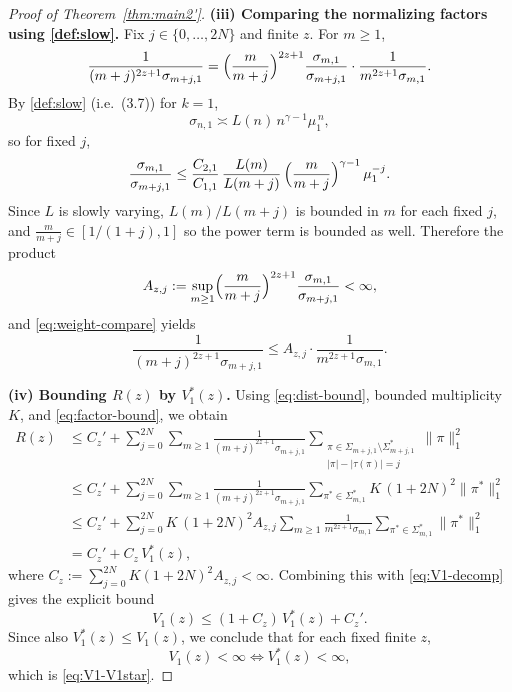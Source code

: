 \documentclass[10pt,a4paper]{amsart}
\begin{document}
\begin{proof}[Proof of Theorem~\ref{thm:main2'}]
\smallskip\noindent
\textbf{(iii) Comparing the normalizing factors using \eqref{def:slow}.}
Fix $j\in\{0,\dots,2N\}$ and finite $z$. For $m\ge1$,
\begin{equation}\label{eq:weight-compare}
\frac{1}{(m+j)^{2z+1}\sigma_{m+j,1}}
=
\Bigl(\frac{m}{m+j}\Bigr)^{2z+1}\frac{\sigma_{m,1}}{\sigma_{m+j,1}}
\cdot \frac{1}{m^{2z+1}\sigma_{m,1}}.
\end{equation}
By \eqref{def:slow} (i.e.\ (3.7)) for $k=1$,
\[
\sigma_{n,1}\asymp L(n)\,n^{\gamma-1}\mu_1^{\,n},
\]
so for fixed $j$,
\[
\frac{\sigma_{m,1}}{\sigma_{m+j,1}}
\le
\frac{C_{2,1}}{C_{1,1}}\,
\frac{L(m)}{L(m+j)}\,
\Bigl(\frac{m}{m+j}\Bigr)^{\gamma-1}\,
\mu_1^{-j}.
\]
Since $L$ is slowly varying, $L(m)/L(m+j)$ is bounded in $m$ for each fixed $j$,
and $\frac{m}{m+j}\in[1/(1+j),1]$ so the power term is bounded as well. Therefore the product
\[
A_{z,j}:=\sup_{m\ge1}\Bigl(\frac{m}{m+j}\Bigr)^{2z+1}\frac{\sigma_{m,1}}{\sigma_{m+j,1}}<\infty,
\]
and \eqref{eq:weight-compare} yields
\begin{equation}\label{eq:factor-bound}
\frac{1}{(m+j)^{2z+1}\sigma_{m+j,1}}
\le A_{z,j}\cdot \frac{1}{m^{2z+1}\sigma_{m,1}}.
\end{equation}

\smallskip\noindent
\textbf{(iv) Bounding $R(z)$ by $V_1^\ast(z)$.}
Using \eqref{eq:dist-bound}, bounded multiplicity $K$, and \eqref{eq:factor-bound}, we obtain
\begin{align*}
R(z)
&\le C_z' + \sum_{j=0}^{2N}\sum_{m\ge1}
\frac{1}{(m+j)^{2z+1}\sigma_{m+j,1}}
\sum_{\substack{\pi\in\Sigma_{m+j,1}\setminus\Sigma_{m+j,1}^\ast\\ |\pi|-|\tau(\pi)|=j}}
\|\pi\|_1^2 \\
&\le C_z' + \sum_{j=0}^{2N}\sum_{m\ge1}
\frac{1}{(m+j)^{2z+1}\sigma_{m+j,1}}
\sum_{\pi^\ast\in\Sigma_{m,1}^\ast} K\,(1+2N)^2 \|\pi^\ast\|_1^2 \\
&\le C_z' + \sum_{j=0}^{2N} K\,(1+2N)^2 A_{z,j}
\sum_{m\ge1}\frac{1}{m^{2z+1}\sigma_{m,1}}\sum_{\pi^\ast\in\Sigma_{m,1}^\ast}\|\pi^\ast\|_1^2 \\
&= C_z' + C_z\, V_1^\ast(z),
\end{align*}
where $C_z:=\sum_{j=0}^{2N} K(1+2N)^2A_{z,j}<\infty$.
Combining this with \eqref{eq:V1-decomp} gives the explicit bound
\begin{equation}\label{eq:V1-upper-explicit}
V_1(z)\le (1+C_z)\,V_1^\ast(z)+C_z'.
\end{equation}
Since also $V_1^\ast(z)\le V_1(z)$, we conclude that for each fixed finite $z$,
\[
V_1(z)<\infty \iff V_1^\ast(z)<\infty,
\]
which is \eqref{eq:V1-V1star}.






\end{proof}
\end{document}
